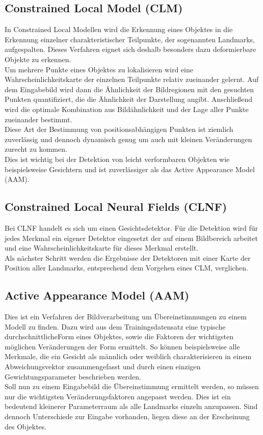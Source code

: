 \subsection{Constrained Local Model (CLM)}
In Constrained Local Modellen wird die Erkennung eines Objektes in die Erkennung einzelner charakteristischer Teilpunkte, der sogenannten Landmarks, aufgespalten. Dieses Verfahren eignet sich deshalb besonders dazu deformierbare Objekte zu erkennen.\\
Um mehrere Punkte eines Objektes zu lokalisieren wird eine Wahrscheinlichkeitskarte der einzelnen Teilpunkte relativ zueinander gelernt. Auf dem Eingabebild wird dann die Ähnlichkeit der Bildregionen mit den gesuchten Punkten quantifiziert, die die Ähnlichkeit der Darstellung angibt. Anschließend wird die optimale Kombination aus Bildähnlichkeit und der Lage aller Punkte zueinander bestimmt.\\
Diese Art der Bestimmung von positionsabhängigen Punkten ist ziemlich zuverlässig und dennoch dynamisch genug um auch mit kleinen Veränderungen zurecht zu kommen.\\
Dies ist wichtig bei der Detektion von leicht verformbaren Objekten wie beispielsweise Gesichtern und ist zuverlässiger als das Active Appearance Model (AAM).
\cite{pdf_CLM}
\subsection{Constrained Local Neural Fields (CLNF)}
Bei CLNF handelt es sich um einen Gesichtsdetektor. Für die Detektion wird für jedes Merkmal ein eigener Detektor eingesetzt der auf einem Bildbereich arbeitet und eine Wahrscheinlichkeitskarte für dieses Merkmal erstellt.\\
Als nächster Schritt werden die Ergebnisse der Detektoren mit einer Karte der Position aller Landmarks, entsprechend dem Vorgehen eines CLM, verglichen.
\cite{CLNF}
\subsection{Active Appearance Model (AAM)}
Dies ist ein Verfahren der Bildverarbeitung um Übereinstimmungen zu einem Modell zu finden. Dazu wird aus dem Trainingsdatensatz eine typische \glqq durchschnittliche\grqq Form eines Objektes, sowie die Faktoren der wichtigsten möglichen Veränderungen der Form ermittelt. So können beispielsweise alle Merkmale, die ein Gesicht als männlich oder weiblich charakterisieren in einem Abweichungsvektor zusammengefasst und durch einen einzigen Gewichtungsparameter beschrieben werden.\\
Soll nun zu einem Eingabebild die Übereinstimmung ermittelt werden, so müssen nur die wichtigsten Veränderungsfaktoren angepasst werden. Dies ist ein bedeutend kleinerer Parameterraum als alle Landmarks einzeln anzupassen. Sind dennoch Unterschiede zur Eingabe vorhanden, liegen diese an der Erscheinung des Objektes.
\cite{wiki_AAM}
